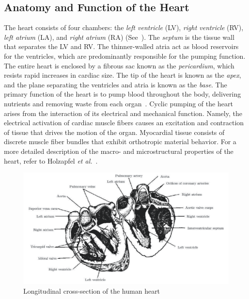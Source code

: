 \subsection{Anatomy and Function of the Heart}
The heart consists of four chambers: the \textit{left ventricle} (LV), \textit{right ventricle} (RV), \textit{left atrium} (LA), and \textit{right atrium} (RA) (See~). The \textit{septum} is the tissue wall that separates the LV and RV. The thinner-walled atria act as blood reservoirs for the ventricles, which are predominantly responsible for the pumping function. The entire heart is enclosed by a fibrous sac known as the \textit{pericardium}, which resists rapid increases in cardiac size. The tip of the heart is known as the \textit{apex}, and the plane separating the ventricles and atria is known as the \textit{base}. The primary function of the heart is to pump blood throughout the body, delivering nutrients and removing waste from each organ~\cite{holzapfel_2009}. Cyclic pumping of the heart arises from the interaction of its electrical and mechanical function. Namely, the electrical activation of cardiac muscle fibers causes an excitation and contraction of tissue that drives the motion of the organ. Myocardial tissue consists of discrete muscle fiber bundles that exhibit orthotropic material behavior. For a more detailed description of the macro- and microstructural properties of the heart, refer to Holzapfel \textit{et al.}~\cite{holzapfel_2009}.

\begin{figure}[htbp!]
\centering
\includegraphics[width=1.0\textwidth]{media/anatomy.png}
\caption{Longitudinal cross-section of the human heart~\cite{katz_2015}}
\label{fig:anatomy}
\end{figure}

